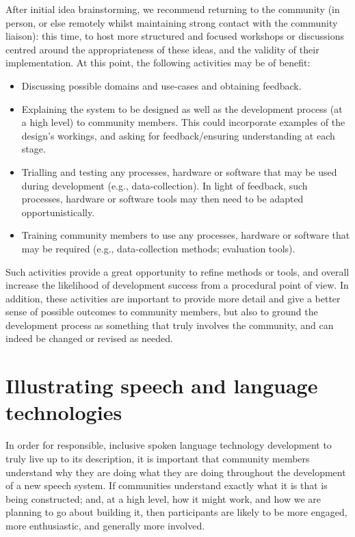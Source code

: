 \documentclass[10pt,twoside,openright]{report}
\begin{document}
After initial idea brainstorming, we recommend returning to the community (in person, or else remotely whilst maintaining strong contact with the community liaison): this time, to host more structured and focused workshops or discussions centred around the appropriateness of these ideas, and the validity of their implementation.
At this point, the following activities may be of benefit: 
\begin{itemize}
    \item Discussing possible domains and use-cases and obtaining feedback.
    \item Explaining the system to be designed as well as the development process (at a high level) to community members.
    This could incorporate examples of the design's workings, and asking for feedback/ensuring understanding at each stage. 
    \item Trialling and testing any processes, hardware or software that may be used during development (e.g., data-collection).
    In light of feedback, such processes, hardware or software tools may then need to be adapted opportunistically.
    \item Training community members to use any processes, hardware or software that may be required (e.g., data-collection methods; evaluation tools). 
\end{itemize}

Such activities provide a great opportunity to refine methods or tools, and overall increase the likelihood of development success from a procedural point of view.
In addition, these activities are important to provide more detail and give a better sense of possible outcomes to community members, but also to ground the development process as something that truly involves the community, and can indeed be changed or revised as needed.


\section{Illustrating speech and language technologies}
In order for responsible, inclusive spoken language technology development to truly live up to its description, it is important that community members understand why they are doing what they are doing throughout the development of a new speech system.
If communities understand exactly what it is that is being constructed; and, at a high level, how it might work, and how we are planning to go about building it, then participants are likely to be more engaged, more enthusiastic, and generally more involved.
\end{document}

